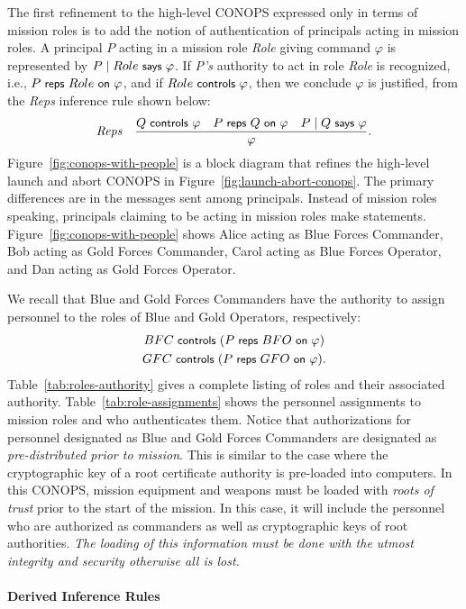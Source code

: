 The first refinement to the high-level CONOPS expressed only in terms
of mission roles is to add the notion of authentication of principals
acting in mission roles. A principal $P$ acting in a mission role
\emph{Role} giving command $\varphi$ is represented by $P \quoting
Role \says \varphi$. If \emph{P's} authority to act in role
\emph{Role} is recognized, i.e., $\reps{P}{Role}{\varphi}$, and if
$Role \controls \varphi$, then we conclude $\varphi$ is justified,
from the \emph{Reps} inference rule shown below:
\begin{gather*}
  \irule
  {Q \controls \varphi \quad \reps{P}{Q}{\varphi} \quad 
   P \quoting Q \says \varphi}
  {\varphi}
  {Reps}.
\end{gather*}
Figure~\ref{fig:conops-with-people} is a block diagram that refines
the high-level launch and abort CONOPS in
Figure~\ref{fig:launch-abort-conops}.  The primary differences are in
the messages sent among principals. Instead of mission roles speaking,
principals claiming to be acting in mission roles make
statements. Figure~\ref{fig:conops-with-people} shows Alice acting as
Blue Forces Commander, Bob acting as Gold Forces Commander, Carol
acting as Blue Forces Operator, and Dan acting as Gold Forces
Operator.

We recall that Blue and Gold Forces Commanders have the authority to
assign personnel to the roles of Blue and Gold Operators,
respectively:
\begin{gather*}
  BFC \controls (\reps{P}{BFO}{\varphi})\\
  GFC \controls (\reps{P}{GFO}{\varphi}).
\end{gather*}
Table~\ref{tab:roles-authority} gives a complete listing of roles and
their associated authority. Table~\ref{tab:role-assignments} shows the
personnel assignments to mission roles and who authenticates them.
Notice that authorizations for personnel designated as Blue and Gold
Forces Commanders are designated as \emph{pre-distributed prior to
  mission}. This is similar to the case where the cryptographic key of
a root certificate authority is pre-loaded into computers. In this
CONOPS, mission equipment and weapons must be loaded with
\emph{roots of trust} prior to the start of the mission. In this
case, it will include the personnel who are authorized as commanders
as well as cryptographic keys of root authorities. \emph{The loading
  of this information must be done with the utmost integrity and
  security otherwise all is lost.}

\paragraph*{Derived Inference Rules}
\label{sec:deriv-infer-rules}

